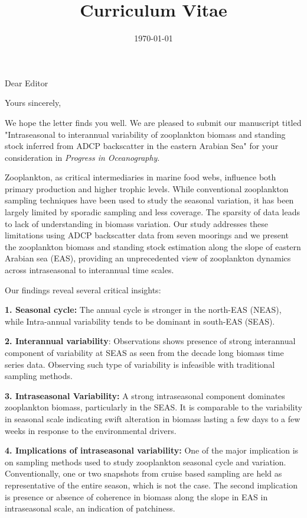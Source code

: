 \documentclass[11pt,a4paper,roman]{moderncv}        %
\title{Curriculum Vitae}                          %
\begin{document}
	
	\date{\today}
	\opening{Dear Editor}
	\closing{Yours sincerely,}


	\makelettertitle
	\justifying
	\setlength{\parindent}{4em}We hope the letter finds you well. We are pleased to submit our manuscript titled "Intraseasonal to interannual variability of zooplankton biomass and standing stock inferred from ADCP backscatter in the eastern Arabian Sea" for your consideration in \textit{Progress in Oceanography}.
	
	\setlength{\parindent}{4em}Zooplankton, as critical intermediaries in marine food webs, influence both primary production and higher trophic levels. While conventional zooplankton sampling techniques have been used to study the seasonal variation, it has been largely limited by sporadic sampling and less coverage. The sparsity of data leads to lack of understanding in biomass variation. Our study addresses these limitations using ADCP backscatter data from seven moorings and we present the zooplankton biomass and standing stock estimation  along the slope of eastern Arabian sea (EAS), providing an unprecedented view of zooplankton dynamics across intraseasonal to interannual time scales. 
	
	Our findings reveal several critical insights:
	
	\textbf{1. Seasonal cycle:} The annual cycle is stronger in the north-EAS (NEAS), while Intra-annual variability tends to be dominant in south-EAS (SEAS).
	
	\textbf{2. Interannual variability}: Observations shows presence of strong interannual component of variability at SEAS as seen from the decade long biomass time series data. Observing such type of variability is infeasible with traditional sampling methods.
	
	\textbf{3. Intraseasonal Variability:} A strong intraseasonal component dominates zooplankton biomass, particularly in the SEAS. It is comparable to the variability in seasonal scale indicating swift alteration in biomass lasting a few days to a few weeks in response to the environmental drivers.
	
	\textbf{4. Implications of intraseasonal variability:} One of the major implication is on sampling methods used to study zooplankton seasonal cycle and variation. Conventionally, one or two snapshots from cruise based sampling are held as representative of the entire season, which is not the case. The second implication is presence or absence of coherence in biomass along the slope in EAS in intraseasonal scale, an indication of patchiness.
		
\end{document}
